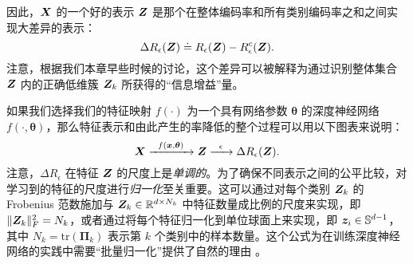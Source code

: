 \documentclass[../../book-main.tex]{subfiles}
\begin{document}

因此，$\bm{X}$ 的一个好的表示 $\bm{Z}$ 是那个在整体编码率和所有类别编码率之和之间实现大差异的表示：
\begin{equation}
	\Delta R_{\epsilon}(\bm{Z}) \doteq R_{\epsilon}(\bm{Z}) - R_{\epsilon}^c(\bm{Z}).
	\label{chap4-eqn:coding-length-reduction}
\end{equation}
注意，根据我们本章早些时候的讨论，这个差异可以被解释为通过识别整体集合 $\bm{Z}$ 内的正确低维簇 $\bm{Z}_k$ 所获得的“信息增益”量。

如果我们选择我们的特征映射 $f(\cdot)$ 为一个具有网络参数 $\bm \theta$ 的深度神经网络 $f(\cdot,\bm \theta)$，那么特征表示和由此产生的率降低的整个过程可以用以下图表来说明：
\begin{equation}
	\bm{X}
	\xrightarrow{\hspace{2mm} f(\bm{x}, \bm \theta)\hspace{2mm}} \bm{Z}  \xrightarrow{\hspace{2mm} \epsilon \hspace{2mm}} \Delta R_{\epsilon}(\bm{Z}).
	\label{chap4-eqn:flow}
\end{equation}
注意，$\Delta R_{\epsilon}$ 在特征 $\bm{Z}$ 的尺度上是{\em 单调的}。为了确保不同表示之间的公平比较，对学习到的特征的尺度进行{\em 归一化}至关重要。这可以通过对每个类别 $\bm{Z}_k$ 的 Frobenius 范数施加与 $\bm{Z}_k \in \mathbb R^{d \times N_k}$ 中特征数量成比例的尺度来实现，即 $\|\bm{Z}_k\|_F^2 = N_k$，或者通过将每个特征归一化到单位球面上来实现，即 $\bm{z}_i \in \mathbb{S}^{d-1}$，其中 $N_k=\mathrm{tr}(\bm \Pi_k)$ 表示第 $k$ 个类别中的样本数量。这个公式为在训练深度神经网络的实践中需要“批量归一化”提供了自然的理由 \cite{ioffe2015batch}。%
\end{document}
